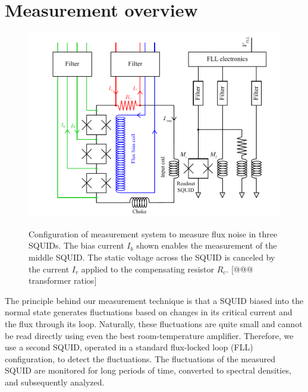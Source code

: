\section{Measurement overview}

\begin{figure}
\centering\includegraphics{experimental/Fig_schematic}\\
\caption[Schematic of measurement system]{Configuration of measurement system to measure flux noise in three SQUIDs. The bias current $I_b$ shown enables the measurement of the middle SQUID. The static voltage across the SQUID is canceled by the current $I_r$ applied to the compensating resistor $R_c$. [@@@ transformer ratios]}
\label{fig:experimental:schematic}
\end{figure}

The principle behind our measurement technique is that a SQUID biased into the normal state generates fluctuations based on changes in its critical current and the flux through its loop. Naturally, these fluctuations are quite small and cannot be read directly using even the best room-temperature amplifier. Therefore, we use a second SQUID, operated in a standard flux-locked loop (FLL) configuration, to detect the fluctuations. The fluctuations of the measured SQUID are monitored for long periods of time, converted to spectral densities, and subsequently analyzed.

